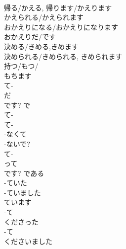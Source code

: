 \documentclass[8pt]{extreport}
\begin{document}
\begin{CJK}{UTF8}{min}
\\	帰る/かえる, 帰ります/かえります 
\\	かえられる/かえられます
\\	おかえりになる/おかえりになります
\\	おかえりだ/です
\\	決める/きめる,きめます 
\\	決められる/きめられる, きめられます	
\\	持つ/もつ/
\\	もちます	
\\	て-
\\	だ 
\\	です?	で	
\\	て-
\\	て-
\\	-なくて
\\	-ないで?
\\	て-
\\	って 
\\	です?	である	
\\	-ていた			
\\	-ていました			
\\	ています			
\\	-て 
\\	くださった			
\\	-て 
\\	くださいました			
\end{CJK}
\end{document}

